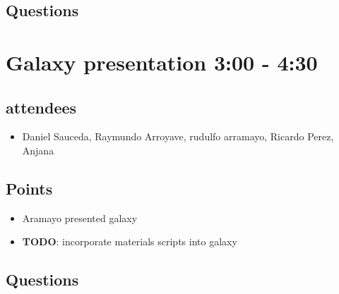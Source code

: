 \documentclass[11pt]{article}
\begin{document}
\subsection{Questions}
\label{sec:orgheadline10}


\section{Galaxy presentation 3:00 - 4:30}
\label{sec:orgheadline15}
\subsection{attendees}
\label{sec:orgheadline12}
\begin{itemize}
\item Daniel Sauceda, Raymundo Arroyave, rudulfo arramayo, Ricardo Perez, Anjana
\end{itemize}
\subsection{Points}
\label{sec:orgheadline13}
\begin{itemize}
\item Aramayo presented galaxy

\item \textbf{TODO}: incorporate materials scripts into galaxy
\end{itemize}

\subsection{Questions}
\label{sec:orgheadline14}
\end{document}
